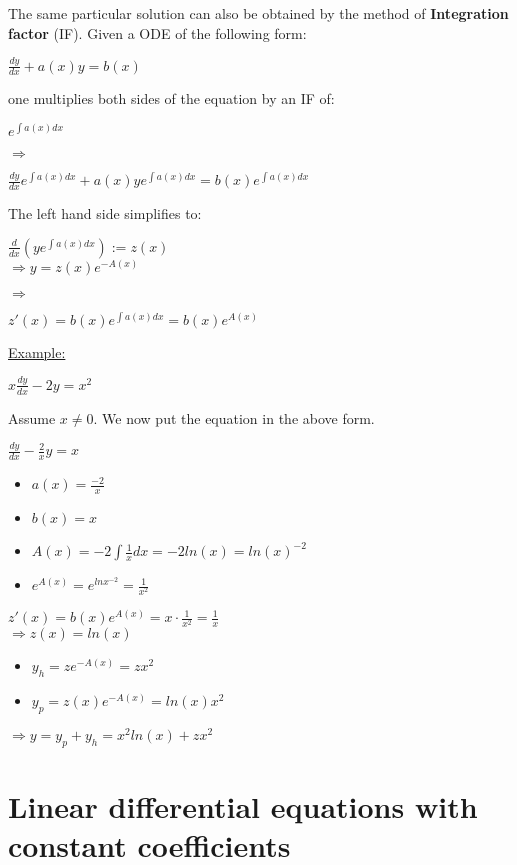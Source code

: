 \documentclass[8pt]{extreport}
\begin{document}
The same particular solution can also be obtained by the method of \textbf{Integration factor} (IF). Given a ODE of the following form:
\begin{center}
$\frac{dy}{dx} + a(x)y = b(x)$
\end{center}
one multiplies both sides of the equation by an IF of:
\begin{center}
$e^{\int a(x)dx}$
\end{center}
$\Rightarrow$
\begin{center}
$\frac{dy}{dx}e^{\int a(x)dx} + a(x)ye^{\int a(x)dx} = b(x)e^{\int a(x) dx}$
\end{center}
The left hand side simplifies to:
\begin{center}
$\frac{d}{dx}(ye^{\int a(x)dx}) := z(x)$\\
$\Rightarrow y = z(x)e^{-A(x)}$
\end{center}
$\Rightarrow$
\begin{center}
$z'(x) = b(x)e^{\int a(x) dx} = b(x) e^{A(x)}$
\end{center}
\underline {Example:}
\begin{center}
$ x \frac{dy}{dx} -2y = x^2$
\end{center}
Assume $x \neq 0$. We now put the equation in the above form.
\begin{center}
$\frac{dy}{dx} - \frac{2}{x}y = x$
\end{center}
\begin{itemize}
\item $a(x) = \frac{-2}{x}$
\item $b(x) = x$
\item $A(x) = -2\int\frac{1}{x}dx = -2ln(x) = ln(x)^{-2}$
\item $e^{A(x)} = e^{lnx^{-2}} = \frac{1}{x^2}$
\end{itemize}
$z'(x) = b(x) e^{A(x)} = x \cdot \frac{1}{x^2} = \frac{1}{x}$\\
$\Rightarrow z(x) = ln(x)$\\
\begin{itemize}
\item $y_h = ze^{-A(x)} = zx^2$
\item $y_p =z(x)e^{-A(x)} = ln(x)x^2$
\end{itemize}
$\Rightarrow y = y_p +y_h = x^2ln(x) + zx^2$

\section{Linear differential equations with constant coefficients}
\end{document}
